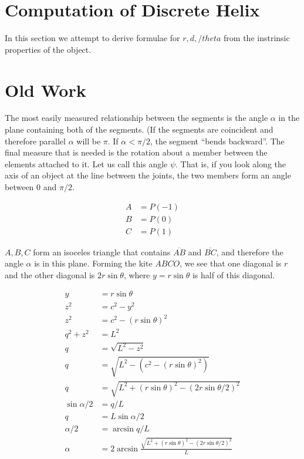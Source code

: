 \documentclass[11pt]{article}
\begin{document}
\section{Computation of Discrete Helix}

In this section we attempt to derive formulae for $r,d,/theta$ from
the instrinsic properties of the object.

\section{Old Work}

The most easily measured relationship between the segments
is the angle $\alpha$ in the plane containing both of the segments. (If the segments are coincident and therefore
parallel $\alpha$ will be $\pi$. If $\alpha < \pi/2$, the segment ``bends backward''.
The final measure that is needed is the rotation about a member between the elements attached to it.
Let us call this angle $\psi$. That is, if you look along the axis of an object at the line
between the joints, the two members form an angle between 0 and $\pi /2$. 

\begin{align*}
    A &= P(-1)  \\
    B &= P(0) \\
    C &= P(1)
\end{align*}

$A,B,C$ form an isoceles triangle that contains $\overline{AB}$ and $\overline{BC}$, and therefore the angle $\alpha$ is in
this plane. Forming the kite $ABCO$, we see that one diagonal is $r$ and the other diagonal is $2 r \sin{\theta}$, where
$y = r \sin{\theta}$ is half of this diagonal. 

\begin{align*}
    y &= r \sin{\theta}  \\
    z^2 &= c^2 - y^2 \\
    z^2 &= c^2 - (r \sin{\theta})^2 \\    
    q^2 + z^2 &= L^2 \\
    q &= \sqrt{L^2 - z^2} \\
    q &= \sqrt{L^2 - (c^2- (r\sin{\theta})^2)} \\
    q &= \sqrt{L^2 + (r\sin{\theta})^2 - (2r\sin{\theta/2})^2 } \\        
    \sin{\alpha/2} &= q/L \\
    q &= L \sin{\alpha/2} \\
    \alpha/2 &= \arcsin{q/L} \\
    \alpha &= 2 \arcsin{\frac{\sqrt{L^2 + (r\sin{\theta})^2 -
          (2r\sin{\theta/2})^2}}
      {L}} \\ 
\end{align*}
\end{document}
